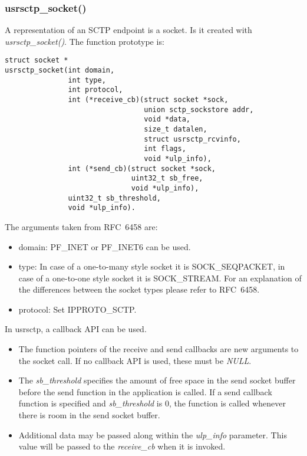 \documentclass[a4paper]{article}
\begin{document}
\subsubsection{usrsctp\_socket()}
A representation of an SCTP endpoint is a socket. Is it created with \textit{usrsctp\_socket()}.
The function prototype is:
\begin{verbatim}
struct socket *
usrsctp_socket(int domain, 
               int type, 
               int protocol,
               int (*receive_cb)(struct socket *sock, 
                                 union sctp_sockstore addr, 
                                 void *data,
                                 size_t datalen, 
                                 struct usrsctp_rcvinfo, 
                                 int flags,
                                 void *ulp_info),
               int (*send_cb)(struct socket *sock, 
                              uint32_t sb_free, 
                              void *ulp_info), 
               uint32_t sb_threshold,
               void *ulp_info).
\end{verbatim}
The arguments taken from RFC~6458 are:
\begin{itemize}
\item domain: PF\_INET or PF\_INET6 can be used.
\item type: In case of a one-to-many style socket it is SOCK\_SEQPACKET, in case of a one-to-one style 
socket it is SOCK\_STREAM. For an explanation of the differences between the socket types please
refer to RFC~6458.
\item protocol: Set IPPROTO\_SCTP.
\end{itemize}

In usrsctp, a callback API can be used.
\begin{itemize}
\item The function pointers of the receive and send callbacks are new arguments to the socket call. If no callback API is used, these must be \textit{NULL}.
\item The \textit{sb\_threshold} specifies the amount of free space in the send socket buffer before the send function in the application is called. If a send callback function is specified and \textit{sb\_threshold} is 0, the function is called whenever there is room in the send socket buffer.
\item Additional data may be passed along within the \textit{ulp\_info} parameter. This value will be passed to the \textit{receive\_cb} when it is invoked.
\end{itemize}
\end{document}
